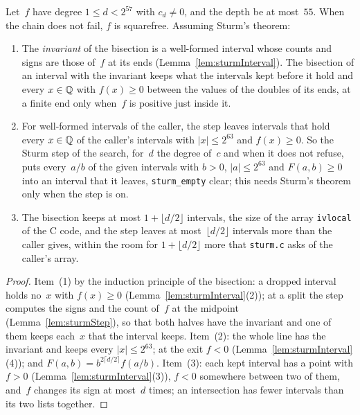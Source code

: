 \begin{lemma}\label{lem:sturmCoverage}
  \leanok
  Let~$f$ have degree $1 \le d < 2^{57}$ with $c_d \ne 0$, and the depth be at most~$55$. When the
  chain does not fail, $f$ is squarefree. Assuming Sturm's theorem:
  \begin{enumerate}
    \item The \emph{invariant} of the bisection is a well-formed interval whose counts and signs
      are those of~$f$ at its ends (Lemma~\ref{lem:sturmInterval}). The bisection of an interval
      with the invariant keeps what the intervals kept before it hold and every $x \in \mathbb{Q}$ with
      $f(x) \ge 0$ between the values of the doubles of its ends, at a finite end only when~$f$ is
      positive just inside it.
    \item For well-formed intervals of the caller, the step leaves intervals that hold every
      $x \in \mathbb{Q}$ of the caller's intervals with $|x| \le 2^{63}$ and $f(x) \ge 0$. So the Sturm
      step of the search, for~$d$ the degree of~$c$ and when it does not refuse, puts every~$a/b$
      of the given intervals with $b > 0$, $|a| \le 2^{63}$ and $F(a, b) \ge 0$ into an interval
      that it leaves, \verb|sturm_empty| clear; this needs Sturm's theorem only when the step is
      on.
    \item The bisection keeps at most $1 + \lfloor d/2 \rfloor$ intervals, the size of the array
      \verb|ivlocal| of the C code, and the step leaves at most~$\lfloor d/2 \rfloor$ intervals
      more than the caller gives, within the room for $1 + \lfloor d/2 \rfloor$ more that
      \verb|sturm.c| asks of the caller's array.
  \end{enumerate}
\end{lemma}

\begin{proof}
  \leanok
  Item~(1) by the induction principle of the bisection: a dropped interval holds no~$x$ with
  $f(x) \ge 0$ (Lemma~\ref{lem:sturmInterval}(2)); at a split the step computes the signs and the
  count of~$f$ at the midpoint (Lemma~\ref{lem:sturmStep}), so that both halves have the invariant
  and one of them keeps each~$x$ that the interval keeps. Item~(2): the whole line has the invariant
  and keeps every $|x| \le 2^{63}$; at the exit $f < 0$ (Lemma~\ref{lem:sturmInterval}(4)); and
  $F(a, b) = b^{2 \lceil d/2 \rceil} f(a/b)$. Item~(3): each kept interval has a point with $f > 0$
  (Lemma~\ref{lem:sturmInterval}(3)), $f < 0$ somewhere between two of them, and~$f$ changes its
  sign at most~$d$ times; an intersection has fewer intervals than its two lists together.
\end{proof}

